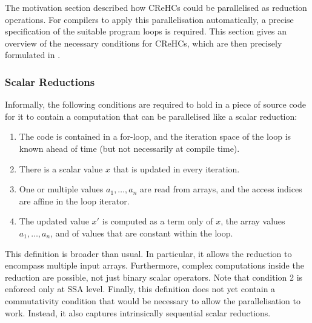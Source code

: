     The motivation section described how CReHCs could be parallelised as
    reduction operations.
    For compilers to apply this parallelisation automatically, a precise
    specification of the suitable program loops is required.
    This section gives an overview of the necessary conditions for CReHCs, which
    are then precisely formulated in .

\subsubsection{Scalar Reductions}
\label{section:scalarcond}

    Informally, the following conditions are required to hold in a piece of
    source code for it to contain a computation that can be parallelised like a
    scalar reduction:
    \begin{enumerate}
        \item The code is contained in a for-loop, and the iteration space of
              the loop is known ahead of time
              (but not necessarily at compile time).
        \item There is a scalar value $x$ that is updated in every iteration.
        \item One or multiple values $a_1,\dots,a_n$ are read from arrays, and
              the access indices are affine in the loop iterator.
        \item The updated value $x'$ is computed as a term only of $x$, the
              array values $a_1,\dots,a_n$, and of values that are constant
              within the loop.
    \end{enumerate}

    This definition is broader than usual.
    In particular, it allows the reduction to encompass multiple input arrays.
    Furthermore, complex computations inside the reduction are possible, not
    just binary scalar operators.
    Note that condition 2 is enforced only at SSA level.
    Finally, this definition does not yet contain a commutativity condition that
    would be necessary to allow the parallelisation to work.
    Instead, it also captures intrinsically sequential scalar reductions.

